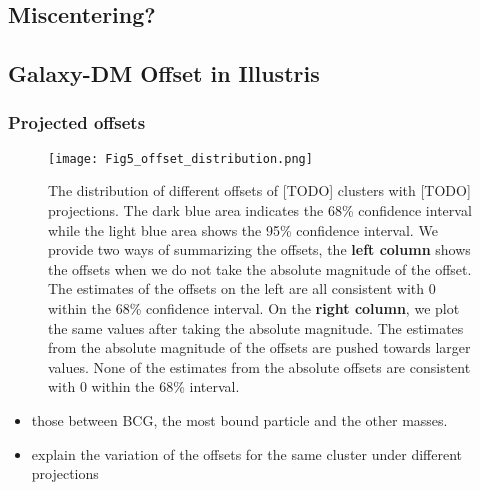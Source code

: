 \subsection{Miscentering?}


\subsection{Galaxy-DM Offset in Illustris}
\subsubsection{Projected offsets}
\begin{figure*}
	\begin{center}
	\texttt{[image: Fig5\_offset\_distribution.png]}
	\caption{ 		
		The distribution of different offsets of [TODO] clusters with [TODO]
		projections. The dark blue area indicates the 68\% confidence interval
		while the light blue area shows the 95\% confidence interval. 
		We provide two ways of summarizing the offsets, the {\bf left column} shows
		the offsets when we do not take the absolute magnitude of the offset.
		The estimates of the offsets on the left are all consistent with 0 within
		the 68\% confidence interval.
		On the {\bf right column}, we plot the same values after taking the
		absolute magnitude. The estimates from the absolute magnitude of the
		offsets are pushed towards larger values. None of the estimates from the
		absolute offsets are consistent with 0 within the 68\% interval.
				\label{fig:offset_distributions}
	}
\end{center}
\end{figure*}



\begin{itemize}
\item those between BCG, the most bound particle and the other masses. 
\item explain the variation of the offsets for the same cluster under different 
projections 
\end{itemize}

% 
% 
% 
% 

